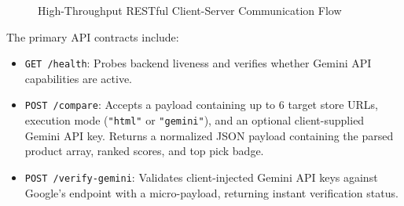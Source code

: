 \documentclass[12pt,a4paper,oneside]{report}
\begin{document}
\begin{figure}[h!]
\centering
{}
\caption{High-Throughput RESTful Client-Server Communication Flow}
\label{fig:comm_flow}
\end{figure}

The primary API contracts include:
\begin{itemize}
    \item \texttt{GET /health}: Probes backend liveness and verifies whether Gemini API capabilities are active.
    \item \texttt{POST /compare}: Accepts a payload containing up to 6 target store URLs, execution mode (\texttt{"html"} or \texttt{"gemini"}), and an optional client-supplied Gemini API key. Returns a normalized JSON payload containing the parsed product array, ranked scores, and top pick badge.
    \item \texttt{POST /verify-gemini}: Validates client-injected Gemini API keys against Google's endpoint with a micro-payload, returning instant verification status.
\end{itemize}
\end{document}
